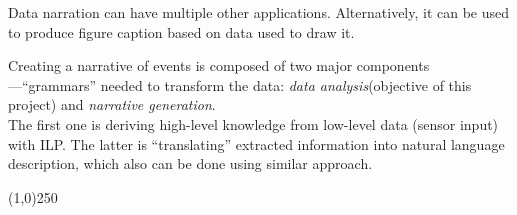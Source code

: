 \documentclass[12pt, a4paper, pdflatex, leqno, twoside, openright]{report}
\begin{document}
Data narration can have multiple other applications. Alternatively, it can be used to produce figure caption based on data used to draw it.

Creating a narrative of events is composed of two major components---``grammars'' needed to transform the data: \emph{data analysis}(objective of this project) and \emph{narrative generation}.\\
The first one is deriving high-level knowledge from low-level data (sensor input) with ILP. The latter is ``translating'' extracted information into natural language description, which also can be done using similar approach.


\begin{center}
\noindent \line(1,0){250}
\end{center}

{}

% 
\end{document}
